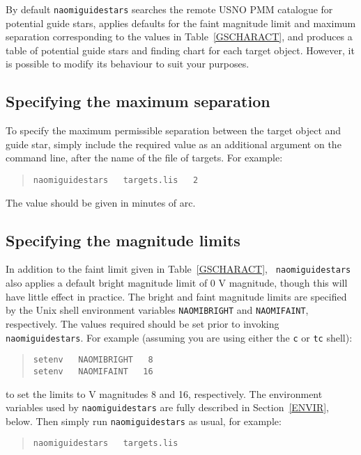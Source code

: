 \documentclass[twoside,11pt]{article}
\renewcommand{\_}{\texttt{\symbol{95}}}
\begin{document}
By default {\tt naomiguidestars} searches the remote USNO PMM catalogue
for potential guide stars, applies defaults for the faint magnitude limit
and maximum separation corresponding to the values in Table~\ref{GSCHARACT},
and produces a table of potential guide stars and finding chart for each
target object.  However, it is possible to modify its behaviour to suit
your purposes.

\subsection{Specifying the maximum separation}

To specify the maximum permissible separation between the target object and
guide star, simply include the required value as an additional argument on
the command line, after the name of the file of targets.  For example:

\begin{quote}
{\tt naomiguidestars ~ targets.lis ~ 2}
\end{quote}

The value should be given in minutes of arc.

\subsection{Specifying the magnitude limits}

In addition to the faint limit given in Table~\ref{GSCHARACT}, {\tt
naomiguidestars} also applies a default bright magnitude limit of 0 V
magnitude, though this will have little effect in practice.  The bright
and faint magnitude limits are specified by the Unix shell environment
variables {\tt NAOMI\_BRIGHT} and {\tt NAOMI\_FAINT}, respectively.  The
values required should be set prior to invoking {\tt naomiguidestars}.  For
example (assuming you are using either the {\tt c} or {\tt tc} shell):

\begin{quote}
{\tt setenv ~ NAOMI\_BRIGHT ~  8 \\
setenv ~ NAOMI\_FAINT       ~  16}
\end{quote}

to set the limits to V magnitudes 8 and 16, respectively.  The environment
variables used by {\tt naomiguidestars} are fully described in
Section~\ref{ENVIR}, below.  Then simply run {\tt naomiguidestars} as
usual, for example:

\begin{quote}
{\tt naomiguidestars ~ targets.lis}
\end{quote}
\end{document}
